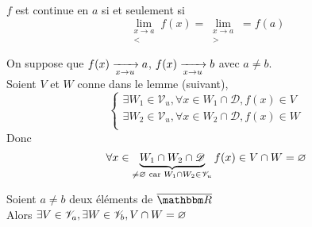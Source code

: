 \begin{prop}
	$f$ est continue en $a$ si et seulement si \[
		\lim_{\substack{
			x \to a\\
			<
		}} f(x) = \lim_{\substack{
			x \to a\\
			>
		}} = f(a)
	\]
\end{prop}

\begin{prv}
	On suppose que $f(x) \xrightarrow[x \to u]{}a$, $f(x) \xrightarrow[x \to u]{}b$ avec $a \neq b$.\\
	Soient $V$ et $W$ conne dans le lemme (suivant), \[
		\begin{cases}
			\exists W_1 \in \mathcal{V}_u, \forall x \in W_1 \cap  \mathcal{D}, f(x) \in V\\
			\exists W_2 \in \mathcal{V}_u, \forall x \in W_2 \cap  \mathcal{D}, f(x) \in W\\
		\end{cases}
	\] 
	Donc \[
		\forall x \in \underbrace{W_1 \cap W_2 \cap \mathcal{D}}_{\neq \varnothing \text{ car } W_1\cap W_2 \in \mathcal{V}_u} f(x)  \in V \cap W = \varnothing
	\] 
\end{prv}

\begin{lem}
	Soient $a \neq  b$ deux éléments de $\overline{\R}$ \\
	Alors $\exists V \in \mathcal{V}_a, \exists W \in \mathcal{V}_b, V \cap W = \varnothing$
\end{lem}

